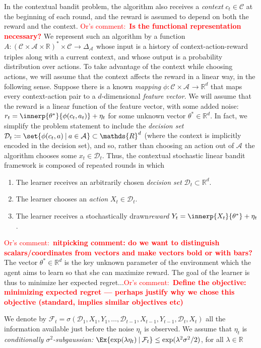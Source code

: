 \documentclass{article}
\newcommand{\os}[1]{\textcolor{red}{Or's comment:~\textbf{#1}}}
\newcommand{\defeq}{\coloneq}
\newcommand{\Real}{\mathds{R}}
\newcommand\given[1][\delimsize]{%
  \providecommand{\delimsize}{}
  \nonscript\:#1\vert\allowbreak\nonscript\:\mathopen{}
}
\newcommand{\C}{\mathcal{C}}
\newcommand{\Aset}[1]{\mathcal{A}_{#1}}
\newcommand{\Dset}[1]{\mathcal{D}_{#1}}
\newcommand{\Cset}[1]{\mathcal{C}_{#1}}
\begin{document}
In the contextual bandit problem, the algorithm also receives a
\emph{context} $c_t\in\C$ at the beginning of each round, and the reward
is assumed to depend on both the reward and the context.
\os{Is the functional representation necessary?}  We represent such an algorithm by a function
$A : (\Cset{}\times\Aset{}\times\Real)^* \times \Cset{} \to
\Delta_{\Aset{}}$ whose input is a history of context-action-reward
triples along with a current context, and whose output is a
probability distribution over actions.
To take advantage of the context while choosing actions, we will
assume that the context affects the reward in a linear way, in the
following sense.  Suppose there is a known \emph{mapping}
$\phi:\Cset{}\times\Aset{}\to\Real^d$ that maps every context-action
pair to a $d$-dimensional \emph{feature vector}.  We will assume that
the reward is a linear function of the feature vector, with some added
noise: $r_t = \innerp{\theta^*}{\phi(c_t,a_t)} + \eta_t$ for some
unknown vector $\theta^*\in\Real^d$. In fact, we simplify the problem statement to include the \emph{decision set}
$\Dset{t} \defeq \set{\phi(c_t,a)\given a\in\Aset{}} \subset \Real^d$
(where the context is implicitly encoded in the decision set), and so, rather than choosing an action out of $\Aset{}$ the algorithm chooses some
$x_t\in\Dset{t}$.
Thus, the contextual stochastic linear bandit framework is composed of repeated rounds in which
\begin{enumerate}
\item The learner receives an arbitrarily chosen \emph{decision set} $\mathcal{D}_t \subset
  \Real^d$.
\item The learner chooses an \emph{action} $X_t \in \mathcal{D}_t$.
\item The learner receives a  stochastically drawn\emph{reward}  $Y_t = \innerp{X_t}{\theta^*} + \eta_t$.
\end{enumerate}
\os{nitpicking comment: do we want to distinguish scalars/coordinates from vectors and make vectors bold or with bars?} The vector $\theta^*\in\Real^d$ is the key unknown parameter of the
environment which the agent aims to learn so that she can maximize reward. The goal of the learner is thus to minimize her expected regret...\os{Define the objective: minimizing expected regret --- perhaps justify why we chose this objective (standard, implies similar objectives etc)}

\begin{assumption}\label{assumption:subgaussian-noise}
  We denote by
  $\mathcal{F}_t =
  \sigma(\mathcal{D}_1,X_1,Y_1,\dotsc,\mathcal{D}_{t-1},X_{t-1},Y_{t-1},\mathcal{D}_t,X_t)$
  all the information available just before the noise $\eta_t$ is
  observed.  We assume that $\eta_t$ is \emph{conditionally
    $\sigma^2$-subgaussian:}
  $
    \Ex{\exp(\lambda\eta_t)\given \mathcal{F}_t} \le \exp(\lambda^2\sigma^2/2)$,
    for all  $\lambda\in\Real$
\end{assumption}
\end{document}
